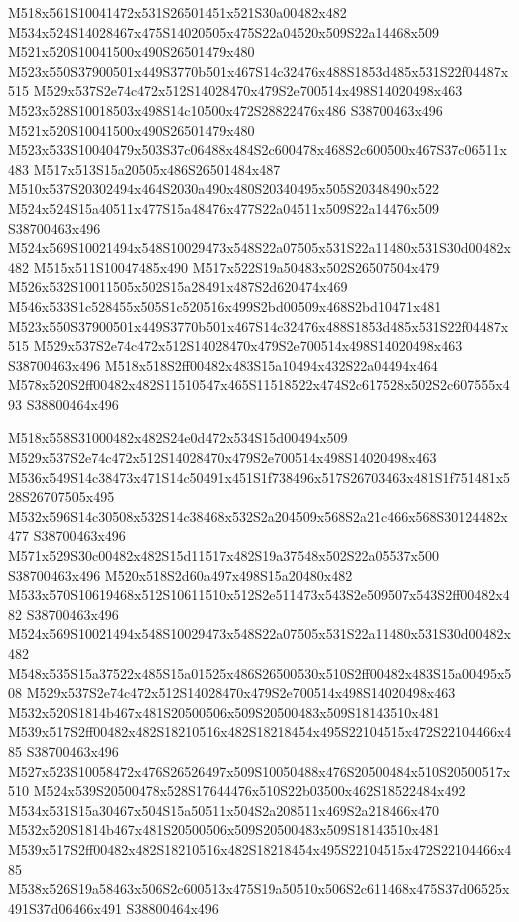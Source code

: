 \documentclass{article}
\begin{document}
\begin{multicols}{2}
M518x561S10041472x531S26501451x521S30a00482x482 M534x524S14028467x475S14020505x475S22a04520x509S22a14468x509 M521x520S10041500x490S26501479x480 M523x550S37900501x449S3770b501x467S14c32476x488S1853d485x531S22f04487x515 M529x537S2e74c472x512S14028470x479S2e700514x498S14020498x463 M523x528S10018503x498S14c10500x472S28822476x486 S38700463x496 M521x520S10041500x490S26501479x480 M523x533S10040479x503S37c06488x484S2c600478x468S2c600500x467S37c06511x483 M517x513S15a20505x486S26501484x487 M510x537S20302494x464S2030a490x480S20340495x505S20348490x522 M524x524S15a40511x477S15a48476x477S22a04511x509S22a14476x509 S38700463x496 M524x569S10021494x548S10029473x548S22a07505x531S22a11480x531S30d00482x482 M515x511S10047485x490 M517x522S19a50483x502S26507504x479 M526x532S10011505x502S15a28491x487S2d620474x469 M546x533S1c528455x505S1c520516x499S2bd00509x468S2bd10471x481 M523x550S37900501x449S3770b501x467S14c32476x488S1853d485x531S22f04487x515 M529x537S2e74c472x512S14028470x479S2e700514x498S14020498x463 S38700463x496 M518x518S2ff00482x483S15a10494x432S22a04494x464 M578x520S2ff00482x482S11510547x465S11518522x474S2c617528x502S2c607555x493 S38800464x496

M518x558S31000482x482S24e0d472x534S15d00494x509 M529x537S2e74c472x512S14028470x479S2e700514x498S14020498x463 M536x549S14c38473x471S14c50491x451S1f738496x517S26703463x481S1f751481x528S26707505x495 M532x596S14c30508x532S14c38468x532S2a204509x568S2a21c466x568S30124482x477 S38700463x496 M571x529S30c00482x482S15d11517x482S19a37548x502S22a05537x500 S38700463x496 M520x518S2d60a497x498S15a20480x482 M533x570S10619468x512S10611510x512S2e511473x543S2e509507x543S2ff00482x482 S38700463x496 M524x569S10021494x548S10029473x548S22a07505x531S22a11480x531S30d00482x482 M548x535S15a37522x485S15a01525x486S26500530x510S2ff00482x483S15a00495x508 M529x537S2e74c472x512S14028470x479S2e700514x498S14020498x463 M532x520S1814b467x481S20500506x509S20500483x509S18143510x481 M539x517S2ff00482x482S18210516x482S18218454x495S22104515x472S22104466x485 S38700463x496 M527x523S10058472x476S26526497x509S10050488x476S20500484x510S20500517x510 M524x539S20500478x528S17644476x510S22b03500x462S18522484x492 M534x531S15a30467x504S15a50511x504S2a208511x469S2a218466x470 M532x520S1814b467x481S20500506x509S20500483x509S18143510x481 M539x517S2ff00482x482S18210516x482S18218454x495S22104515x472S22104466x485 M538x526S19a58463x506S2c600513x475S19a50510x506S2c611468x475S37d06525x491S37d06466x491 S38800464x496


\end{multicols}
\end{document}
